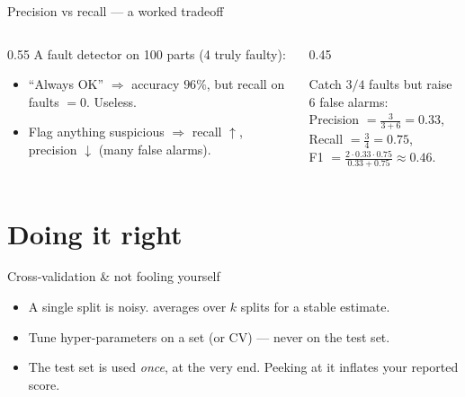 \documentclass[10pt,aspectratio=169]{beamer}
\begin{document}
\begin{frame}{Precision vs recall — a worked tradeoff}
  \begin{columns}[T]
    \begin{column}{0.55\textwidth}
      A fault detector on 100 parts (4 truly faulty):
      \begin{itemize}
        \item ``Always OK'' $\Rightarrow$ accuracy $96\%$, but recall on faults $=0$. Useless.
        \item Flag anything suspicious $\Rightarrow$ recall $\uparrow$, precision $\downarrow$ (many false alarms).
      \end{itemize}
    \end{column}
    \begin{column}{0.45\textwidth}
      \begin{mathbox}
        Catch $3/4$ faults but raise $6$ false alarms:\\[3pt]
        Precision $=\tfrac{3}{3+6}=0.33$,\\[2pt]
        Recall $=\tfrac{3}{4}=0.75$,\\[2pt]
        F1 $=\tfrac{2\cdot0.33\cdot0.75}{0.33+0.75}\approx 0.46$.
      \end{mathbox}
    \end{column}
  \end{columns}
\end{frame}

\section{Doing it right}

\begin{frame}{Cross-validation \& not fooling yourself}
  \begin{itemize}
    \item A single split is noisy.  averages over $k$ splits for a stable estimate.
    \item Tune hyper-parameters on a  set (or CV) — never on the test set.
    \item The test set is used \emph{once}, at the very end. Peeking at it inflates your reported score.
  \end{itemize}
\end{frame}
\end{document}
